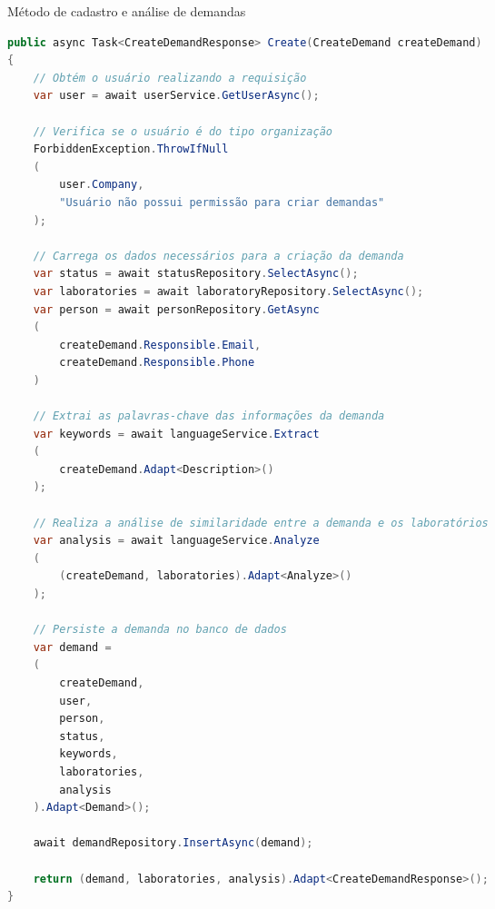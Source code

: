 \begin{sourcecode}[H]
  \caption{\label{codigo:demand-analyze}Método de cadastro e análise de demandas}
  \begin{lstlisting}[frame=single, language=Java]
public async Task<CreateDemandResponse> Create(CreateDemand createDemand)
{
    // Obtém o usuário realizando a requisição
    var user = await userService.GetUserAsync();

    // Verifica se o usuário é do tipo organização
    ForbiddenException.ThrowIfNull
    (
        user.Company, 
        "Usuário não possui permissão para criar demandas"
    );

    // Carrega os dados necessários para a criação da demanda
    var status = await statusRepository.SelectAsync();
    var laboratories = await laboratoryRepository.SelectAsync();
    var person = await personRepository.GetAsync
    (
        createDemand.Responsible.Email, 
        createDemand.Responsible.Phone
    )

    // Extrai as palavras-chave das informações da demanda
    var keywords = await languageService.Extract
    (
        createDemand.Adapt<Description>()
    );

    // Realiza a análise de similaridade entre a demanda e os laboratórios
    var analysis = await languageService.Analyze
    (
        (createDemand, laboratories).Adapt<Analyze>()
    );

    // Persiste a demanda no banco de dados
    var demand = 
    (
        createDemand, 
        user, 
        person, 
        status, 
        keywords, 
        laboratories, 
        analysis
    ).Adapt<Demand>();

    await demandRepository.InsertAsync(demand);

    return (demand, laboratories, analysis).Adapt<CreateDemandResponse>();
}
\end{lstlisting}
  \fonte{}
\end{sourcecode}